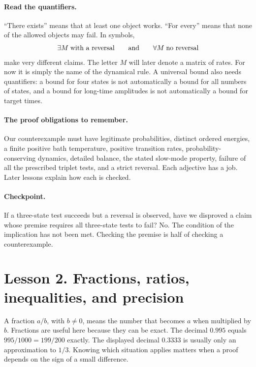 \paragraph{Read the quantifiers.}
``There exists'' means that at least one object works. ``For every'' means that
none of the allowed objects may fail. In symbols,
\[
\exists M\;\text{with a reversal}
\qquad\hbox{and}\qquad
\forall M\;\text{no reversal}
\]
make very different claims. The letter $M$ will later denote a matrix of rates.
For now it is simply the name of the dynamical rule. A universal bound also
needs quantifiers: a bound for four states is not automatically a bound for all
numbers of states, and a bound for long-time amplitudes is not automatically a
bound for target times.

\paragraph{The proof obligations to remember.}
Our counterexample must have legitimate probabilities, distinct ordered
energies, a finite positive bath temperature, positive transition rates,
probability-conserving dynamics, detailed balance, the stated slow-mode
property, failure of all the prescribed triplet tests, and a strict reversal.
Each adjective has a job. Later lessons explain how each is checked.

\paragraph{Checkpoint.}
If a three-state test succeeds but a reversal is observed, have we disproved a
claim whose premise requires all three-state tests to fail? No. The condition
of the implication has not been met. Checking the premise is half of checking
a counterexample.

\clearpage
\section*{Lesson 2. Fractions, ratios, inequalities, and precision}
A fraction $a/b$, with $b\ne0$, means the number that becomes $a$ when multiplied
by $b$. Fractions are useful here because they can be exact. The decimal
$0.995$ equals $995/1000=199/200$ exactly. The displayed decimal $0.3333$ is
usually only an approximation to $1/3$. Knowing which situation applies matters
when a proof depends on the sign of a small difference.

